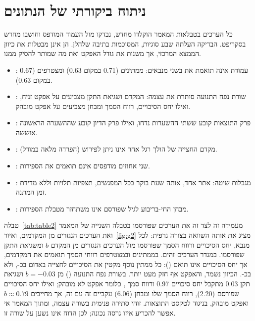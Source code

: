 \begin{statrow}[3]
\end{statrow}

\section{ניתוח ביקורתי של הנתונים}\label{sec:critical}
כל הערכים בטבלאות המאמר הוקלדו מחדש, נבדקו מול העמוד המודפס וחושבו מחדש בסקריפט.
הבדיקה העלתה שבע סוגיות, המסוכמות בתיבה שלהלן. הן אינן מבטלות את כיוון הממצא המרכזי, אך משנות את גודל האפקט ואת מה שמותר להסיק ממנו.

\begin{cautionbox}
\begin{itemize}
\item {}: עמודת  אינה תואמת את  בשני מנבאים: ממתינים (\num{0.71} במקום \num{0.63}) ומצטרפים (\num{0.67} במקום \num{0.63}).
\item {}: שורת נפח התנועה סותרת את עצמה: המקדם ושגיאת התקן מצביעים על אפקט זניח, ואילו יחס הסיכויים, רווח הסמך ומבחן  מצביעים על אפקט מובהק.
\item {}: פרק התוצאות קובע ששתי ההשערות נדחו, ואילו פרק הדיון קובע שההשערה הראשונה אוששה.
\item {}: מקדם החצייה של הולך רגל אחר אינו ניתן לפירוש (הפרדה מלאה במודל).
\item {}: שני אחוזים מודפסים אינם תואמים את הספירות.
\item {}: מגבלות שיטה: אתר אחד, אותה שעת בוקר בכל המפגשים, תצפיות תלויות וללא מדידת זמן המתנה.
\item {}: מבחן החי-בריבוע לגיל שפורסם אינו משתחזר מטבלת הספירות.
\end{itemize}
\end{cautionbox}

טבלה~\ref{tab:table2} מעמידה זה לצד זה את הערכים שפורסמו בטבלה השנייה של המאמר ואת הערכים הנגזרים מן המקדמים, ואיור~\ref{fig:g2} מציג את אותה השוואה בצורה גרפית: לכל מנבא, יחס הסיכויים ורווח הסמך שפורסמו מול הערכים הנגזרים מן המקדם $b$ ומשגיאת התקן שפורסמו.
במגדר הערכים זהים. בממתינים ובמצטרפים רווחי הסמך תואמים את המקדמים, אך יחס הסיכויים אינו תואם ():
כל ממתין נוסף מקטין את הסיכויים לחצייה באדום בכ-, ולא בכ-. הכיוון נשמר, והאפקט אף חזק מעט יותר.
בשורת נפח התנועה () מן $b = -0.03$ ושגיאת תקן \num{0.03} מתקבל יחס סיכויים \num{0.97} ורווח סמך , כלומר אפקט לא מובהק;
ואילו יחס הסיכויים שפורסם (\num{2.20}), רווח הסמך שלו ומבחן  (\num{6.06}) עקביים זה עם זה, אך מחייבים $b \approx 0.79$ ואפקט מובהק, בניגוד לטקסט התוצאות.
זוהי סתירה פנימית בשורה עצמה, ומתוך המאמר אי אפשר להכריע איזו גרסה נכונה; לכן הדוח אינו נשען על שורה זו.

